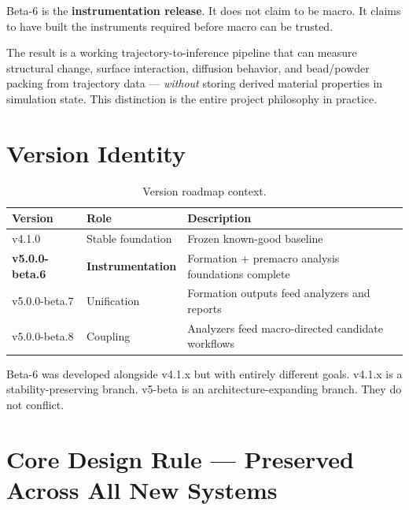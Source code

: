 \documentclass[11pt,a4paper]{article}
\begin{document}
\begin{docnote}
Beta-6 is the \textbf{instrumentation release}. It does not claim to be macro. It claims to
have built the instruments required before macro can be trusted.
\end{docnote}

The result is a working trajectory-to-inference pipeline that can measure structural change,
surface interaction, diffusion behavior, and bead/powder packing from trajectory data ---
\emph{without} storing derived material properties in simulation state. This distinction is the
entire project philosophy in practice.

\section{Version Identity}

\begin{table}[h!]
\centering
\begin{tabularx}{\linewidth}{llX}
\toprule
\textbf{Version} & \textbf{Role} & \textbf{Description} \\
\midrule
v4.1.0 & Stable foundation & Frozen known-good baseline \\
\textbf{v5.0.0-beta.6} & \textbf{Instrumentation} & Formation + premacro analysis foundations complete \\
v5.0.0-beta.7 & Unification & Formation outputs feed analyzers and reports \\
v5.0.0-beta.8 & Coupling & Analyzers feed macro-directed candidate workflows \\
\bottomrule
\end{tabularx}
\caption{Version roadmap context.}
\end{table}

Beta-6 was developed alongside v4.1.x but with entirely different goals. v4.1.x is a
stability-preserving branch. v5-beta is an architecture-expanding branch. They do not conflict.

\section{Core Design Rule --- Preserved Across All New Systems}
\end{document}
